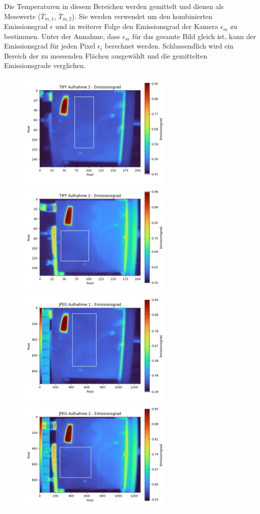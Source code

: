 \documentclass{article}
\begin{document}
Die Temperaturen in diesem Bereichen werden gemittelt und dienen als Messwerte ($\overline T_{m,1}$, $\overline T_{m,2}$).
Sie werden verwendet um den kombinierten Emissionsgrad $\epsilon$ und in weiterer Folge den Emissionsgrad der Kamera $\epsilon_m$ zu bestimmen.
Unter der Annahme, dass $\epsilon_m$ für das gesamte Bild gleich ist, kann der Emissionsgrad für jeden Pixel $\epsilon_i$ berechnet werden.
Schlussendlich wird ein Bereich der zu messenden Flächen ausgewählt und die gemittelten Emissionsgrade verglichen.

\begin{figure}[H]
    \centering
    \captionsetup{width=14cm}
    \includegraphics[width=7.5cm]{img/eps_tiff_1.png}
    \includegraphics[width=7.5cm]{img/eps_tiff_2.png}
    \includegraphics[width=7.5cm]{img/eps_jpg_1.png}
    \includegraphics[width=7.5cm]{img/eps_jpg_2.png}

\end{figure}
\end{document}
